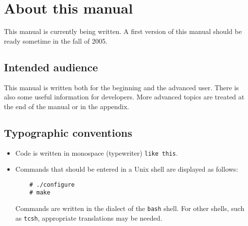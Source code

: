 \chapter*{About this manual}

This manual is currently being written. A first version of this manual
should be ready sometime in the fall of 2005.

\section*{Intended audience}

This manual is written both for the beginning and the advanced user.
There is also some useful information for developers. More advanced topics
are treated at the end of the manual or in the appendix.

\section*{Typographic conventions}

\begin{itemize}
\item
  Code is written in monospace (typewriter) \texttt{like this}.
\item
  Commands that should be entered in a Unix shell
  are displayed as follows:
  \begin{verbatim}
    # ./configure
    # make
  \end{verbatim}
  Commands are written in the dialect of the \texttt{bash} shell. For
  other shells, such as \texttt{tcsh}, appropriate translations may be
  needed.
\end{itemize}
